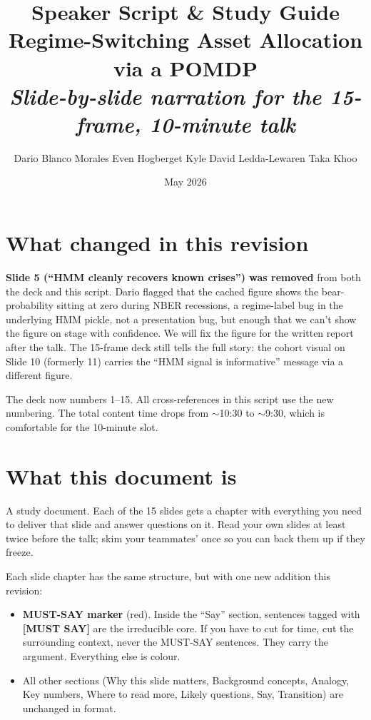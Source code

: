 \documentclass[11pt]{article}
\title{
  \LARGE\textbf{Speaker Script \& Study Guide}\\[6pt]
  \large Regime-Switching Asset Allocation via a POMDP\\[2pt]
  \normalsize\itshape Slide-by-slide narration for the 15-frame, 10-minute talk
}
\author{Dario Blanco Morales \quad Even Hogberget \quad Kyle David Ledda-Lewaren \quad Taka Khoo}
\date{May 2026}
\begin{document}
\maketitle
\thispagestyle{empty}

\section*{What changed in this revision}

\textbf{Slide 5 (``HMM cleanly recovers known crises'') was removed} from both the deck and this script. Dario flagged that the cached figure shows the bear-probability sitting at zero during NBER recessions, a regime-label bug in the underlying HMM pickle, not a presentation bug, but enough that we can't show the figure on stage with confidence. We will fix the figure for the written report after the talk. The 15-frame deck still tells the full story: the cohort visual on Slide 10 (formerly 11) carries the ``HMM signal is informative'' message via a different figure.

The deck now numbers 1--15. All cross-references in this script use the new numbering. The total content time drops from $\sim$10:30 to $\sim$9:30, which is comfortable for the 10-minute slot.

\section*{What this document is}

A study document. Each of the 15 slides gets a chapter with everything you need to deliver that slide and answer questions on it. Read your own slides at least twice before the talk; skim your teammates' once so you can back them up if they freeze.

Each slide chapter has the same structure, but with one new addition this revision:

\begin{itemize}
  \item \textbf{MUST-SAY marker} (red). Inside the ``Say'' section, sentences tagged with \textcolor{must}{\textbf{[MUST SAY]}} are the irreducible core. If you have to cut for time, cut the surrounding context, never the MUST-SAY sentences. They carry the argument. Everything else is colour.
  \item All other sections (Why this slide matters, Background concepts, Analogy, Key numbers, Where to read more, Likely questions, Say, Transition) are unchanged in format.
\end{itemize}
\end{document}
